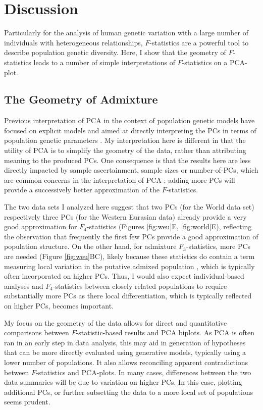 \documentclass[12pt,fullpage, a4paper]{article}
\begin{document}
\section{Discussion}
Particularly for the analysis of human genetic variation with a large number of individuals with heterogeneous relationships, $F$-statistics  are  a powerful tool to describe population genetic diversity. Here, I show that the geometry of $F$-statistics \citep{oteo-garcia2021} leads to a number of simple interpretations of $F$-statistics on a PCA-plot. 

\subsection{The Geometry of Admixture}
Previous interpretation of PCA in the context of population genetic models have focused on explicit models and aimed at directly interpreting the PCs in terms of population genetic parameters \citep{cavalli-sforza1975, novembre2008a, francois2010, francois2021}. My interpretation here is different in that the utility of PCA is to simplify the geometry of the data, rather than attributing meaning to the produced PCs. One consequence is that the results here are less directly impacted by sample ascertainment, sample sizes or number-of-PCs, which are common concerns in the interpretation of PCA \citep{novembre2008a, mcvean2009, francois2010, francois2021}; adding more PCs will provide a successively better approximation of the $F$-statistics. 

The two data sets I analyzed here suggest that two PCs (for the World data set) respectively three PCs (for the Western Eurasian data) already provide a very good approximation for $F_4$-statistics (Figures \ref{fig:weu}E, \ref{fig:world}E), reflecting the observation that frequently the first few PCs provide a good approximation of population structure. On the other hand, for admixture $F_3$-statistics, more PCs are needed (Figure \ref{fig:weu}BC), likely because these statistics do contain a term measuring local variation in the putative admixed population \citep{peter2016}, which is typically often incorporated on higher PCs. Thus, I would also expect individual-based analyses and $F_4$-statistics between closely related populations to require substantially more PCs as there local differentiation, which is typically reflected on higher PCs, becomes important.

My focus on the geometry of the data allows for direct and quantitative comparisons between $F$-statistic-based results and PCA biplots. As PCA is often ran in an early step in data analysis, this may aid in generation of hypotheses that can be more directly evaluated using generative models, typically using a lower number of populations. It also allows reconciling apparent contradictions between $F$-statistics and PCA-plots. In many cases, differences between the two data summaries will be due to variation on higher PCs. In this case, plotting additional PCs, or further subsetting the data to a more local set of populations seems prudent. 
\end{document}
